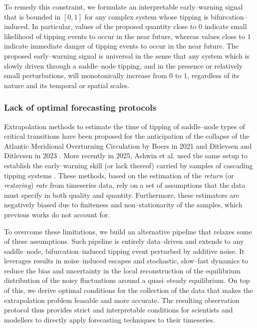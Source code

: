 To remedy this constraint, we formulate an interpretable early--warning signal that is bounded in $[0,1]$ for any complex system whose tipping is bifurcation--induced.
In particular, values of the proposed quantity close to $0$ indicate small likelihood of tipping events to occur in the near future, whereas values close to $1$ indicate immediate danger of tipping events to occur in the near future.
The proposed early--warning signal is universal in the sense that any system which is slowly driven through a saddle--node tipping, and in the presence or relatively small perturbations, will monotonically increase from $0$ to $1$, regardless of its nature and its temporal or spatial scales.

\subsubsection{Lack of optimal forecasting protocols}
Extrapolation methods to estimate the time of tipping of saddle--node types of critical transitions have been proposed for the anticipation of the collapse of the Atlantic Meridional Overturning Circulation by Boers in 2021 \cite{Boers2021} and Ditlevsen and Ditlevsen in 2023 \cite{Ditlevsen2023}.
More recently in 2025, Ashwin et al. used the same setup to establish the early--warning skill (or lack thereof) carried by samples of cascading tipping systems \cite{Ashwin2025}.
These methods, based on the estimation of the \emph{return} (or \emph{restoring}) \emph{rate} from timeseries data, rely on a set of assumptions that the data must specify in both quality and quantity.
Furthermore, these estimators are negatively biased due to finiteness and non--stationarity of the samples, which previous works do not account for.

To overcome these limitations, we build an alternative pipeline that relaxes some of these assumptions.
Such pipeline is entirely data--driven and extends to any saddle--node, bifurcation--induced tipping event perturbed by additive noise.
It leverages results in noise--induced escapes and stochastic, slow--fast dynamics to reduce the bias and uncertainty in the local reconstruction of the equilibrium distribution of the noisy fluctuations around a quasi--steady equilibrium.
On top of this, we derive optimal conditions for the collection of the data that makes the extrapolation problem feasable and more accurate.
The resulting observation protocol thus provides strict and interpretable conditions for scientists and modellers to directly apply forecasting techniques to their timeseries.

